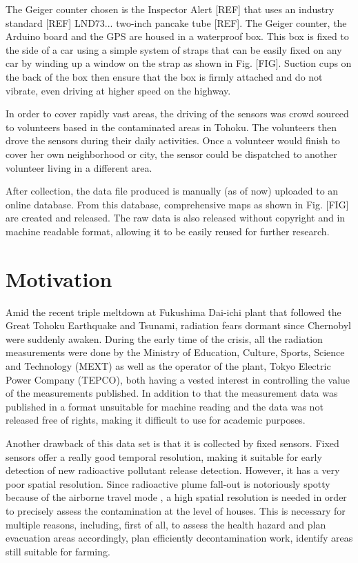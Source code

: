 \documentclass[11pt]{article}
\begin{document}
The Geiger counter chosen is the Inspector Alert [REF] that uses an industry
standard [REF] LND73... two-inch pancake tube [REF].  The Geiger counter, the
Arduino board and the GPS are housed in a waterproof box.  This box is fixed to
the side of a car using a simple system of straps that can be easily fixed on
any car by winding up a window on the strap as shown in Fig. [FIG].  Suction
cups on the back of the box then ensure that the box is firmly attached and do
not vibrate, even driving at higher speed on the highway.

In order to cover rapidly vast areas, the driving of the sensors was crowd
sourced to volunteers based in the contaminated areas in Tohoku.  The
volunteers then drove the sensors during their daily activities. Once a
volunteer would finish to cover her own neighborhood or city, the sensor could
be dispatched to another volunteer living in a different area.

After collection, the data file produced is manually (as of now) uploaded to an
online database. From this database, comprehensive maps as shown in Fig. [FIG]
are created and released. The raw data is also released without copyright and
in machine readable format, allowing it to be easily reused for further
research.


\section*{Motivation}
\label{sec:motivation}

Amid the recent triple meltdown at Fukushima Dai-ichi plant that followed the
Great Tohoku Earthquake and Tsunami, radiation fears dormant since Chernobyl
were suddenly awaken.  During the early time of the crisis, all the radiation
measurements were done by the Ministry of Education, Culture, Sports, Science
and Technology (MEXT) as well as the operator of the plant, Tokyo Electric
Power Company (TEPCO), both having a vested interest in controlling the value
of the measurements published.  In addition to that the measurement data was
published in a format unsuitable for machine reading and the data was not
released free of rights, making it difficult to use for academic purposes.

Another drawback of this data set is that it is collected by fixed sensors.
Fixed sensors offer a really good temporal resolution, making it suitable for
early detection of new radioactive pollutant release detection. However, it has
a very poor spatial resolution. Since radioactive plume fall-out is notoriously
spotty because of the airborne travel mode \cite{terada2008development}, a high
spatial resolution is needed in order to precisely assess the contamination at
the level of houses.  This is necessary for multiple reasons, including, first
of all, to assess the health hazard and plan evacuation areas accordingly, plan
efficiently decontamination work, identify areas still suitable for farming.
\end{document}

